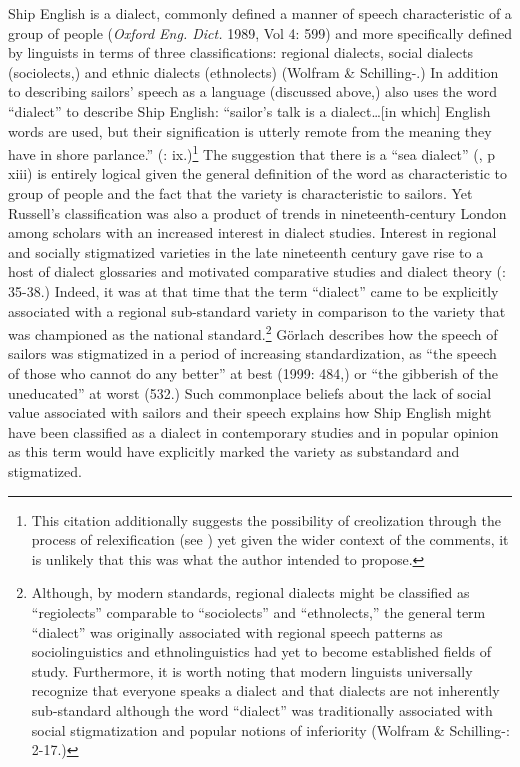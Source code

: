 Ship English is a dialect, commonly defined a manner of speech characteristic of a group of people (\textit{Oxford Eng. Dict.} 1989, Vol 4: 599) and more specifically defined by linguists in terms of three classifications: regional dialects, social dialects (sociolects,) and ethnic dialects (ethnolects) (Wolfram \& Schilling-\citealt{Estes2016}.) In addition to describing sailors’ speech as a language (discussed above,) \citet{Russell1883} also uses the word “dialect” to describe Ship English: “sailor’s talk is a dialect…[in which] English words are used, but their signification is utterly remote from the meaning they have in shore parlance.” (\citealt{Russell1883}: ix.)\footnote{This citation additionally suggests the possibility of creolization through the process of relexification (see \citealt{Thompson1961}) yet given the wider context of the comments, it is unlikely that this was what the author intended to propose.}  The suggestion that there is a “sea dialect” (\citealt{Russell1883}, p xiii) is entirely logical given the general definition of the word as characteristic to group of people and the fact that the variety is characteristic to sailors. Yet Russell’s classification was also a product of trends in nineteenth-century London among scholars with an increased interest in dialect studies. Interest in regional and socially stigmatized varieties in the late nineteenth century gave rise to a host of dialect glossaries {and motivated comparative studies and dialect theory (\citealt{Petyt1980}: 35-38.) Indeed, it was at that time that the term “dialect” came to be explicitly associated with a regional sub-standard variety in comparison to the variety that was championed as the national standard.}\footnote{{Although}, by modern standards, regional dialects might be classified as “regiolects” {comparable to “sociolects” and “ethnolects,” the general term “dialect” was originally} associated with regional speech patterns as sociolinguistics and ethnolinguistics had yet to become established fields of study. Furthermore,{ it is worth noting that modern} linguists universally recognize that everyone speaks a dialect and that dialects are not inherently sub-standard although the word “dialect” was traditionally associated with social stigmatization and popular notions of inferiority (Wolfram \& Schilling-\citealt{Estes2016}: 2-17.)} {} Görlach describes how{ the} speech of sailors was stigmatized in a period of increasing standardization, as “the speech of those who cannot do any better” at best (1999: 484,) or “the gibberish of the uneducated” at worst (532.){ Such commonplace beliefs about the lack of social value associated with sailors and their speech explains how Ship English might have been classified as a dialect in contemporary studies and in popular opinion as this term would have explicitly marked the variety as substandard and stigmatized.}

